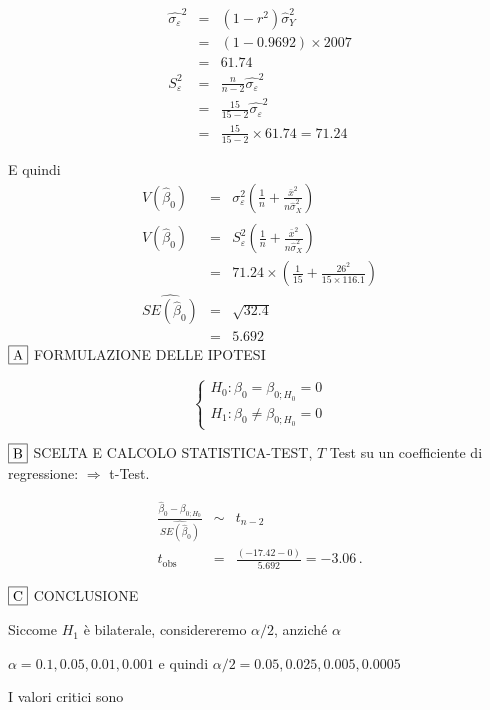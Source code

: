 \documentclass[
  11pt,
]{book}
\theoremstyle{mytheoremstyle}
\theoremstyle{mydefstyle}
\newenvironment{sol}
  {
  \begin{tcolorbox}[enhanced,breakable,arc=0.1mm,boxrule=1pt,colback=white,colframe=iblue,
  title=\bf \fontfamily{lmss}\selectfont \hspace{.5 cm} Soluzione,drop fuzzy shadow]

}{
\end{tcolorbox}
  }
\begin{document}
\begin{sol}
\begin{eqnarray*}
\hat{\sigma_\varepsilon}^2&=&(1-r^2)\hat\sigma_Y^2\\
&=& (1- 0.9692 )\times 2007 \\
   &=&  61.74 \\
   S_\varepsilon^2 &=& \frac{n} {n-2} \hat{\sigma_\varepsilon}^2\\
   &=&  \frac{ 15 } { 15 -2} \hat{\sigma_\varepsilon}^2 \\
 &=&  \frac{ 15 } { 15 -2} \times  61.74  =  71.24  
\end{eqnarray*}

E quindi\begin{eqnarray*}
V(\hat\beta_{0}) &=& \sigma_{\varepsilon}^{2} \left( \frac{1} {n}  +  \frac{\bar{x}^{2}} {n \hat{\sigma}^{2}_{X}} \right)\\
\widehat{V(\hat\beta_{0})} &=& S_{\varepsilon}^{2}\left( \frac{1} {n}  +  \frac{\bar{x}^{2}} {n \hat{\sigma}^{2}_{X}} \right)\ \\
 &=&  71.24 \times\left( \frac{1} { 15 }  +  \frac{ 26 ^{2}} { 15 \times  116.1 } \right)\\
 \widehat{SE(\hat\beta_{0})}        &=&  \sqrt{ 32.4 }\\
 &=&  5.692 
\end{eqnarray*}
\(\fbox{A}\) FORMULAZIONE DELLE IPOTESI

\[\begin{cases}
   H_0: \beta_0 = \beta_{0;H_0}=0 \\
   H_1: \beta_0 \neq \beta_{0;H_0}=0 
   \end{cases}\]

\(\fbox{B}\) SCELTA E CALCOLO STATISTICA-TEST, \(T\)
Test su un coefficiente di regressione: \(\Rightarrow\) t-Test.

\begin{eqnarray*}
 \frac{\hat\beta_{ 0 } - \beta_{ 0 ;H_0}} {\widehat{SE(\hat\beta_{ 0 })}}&\sim&t_{n-2}\\
   t_{\text{obs}}
&=& \frac{ ( -17.42 -  0 )} { 5.692 }
 =   -3.06 \, .
\end{eqnarray*}

\(\fbox{C}\) CONCLUSIONE

Siccome \(H_1\) è bilaterale, considereremo \(\alpha/2\),
anziché \(\alpha\)

\(\alpha=0.1, 0.05, 0.01, 0.001\) e quindi \(\alpha/2=0.05, 0.025, 0.005, 0.0005\)

I valori critici sono


\end{sol}
\end{document}

